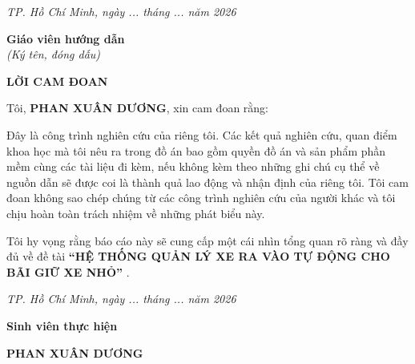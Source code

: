 \documentclass[13pt,a4paper]{report}
\begin{document}
\vspace{1.4cm}

\begin{flushright}
	{\large \textit{TP. Hồ Chí Minh, ngày ... tháng ... năm 2026}}
\end{flushright}

\vspace{0.6cm}

\begin{flushright}
	{\large \textbf{Giáo viên hướng dẫn}}\\[0.55cm]
	{\large \textit{(Ký tên, đóng dấu)}}
\end{flushright}

\newpage
\thispagestyle{empty}

\begin{center}
	{\LARGE \bfseries LỜI CAM ĐOAN}
\end{center}

\vspace{1.2cm}

\begin{center}
	\begin{minipage}{0.88\textwidth}
		\fontsize{14pt}{21pt}\selectfont
		\setlength{\parindent}{1.5cm}
		\justifying
		
		Tôi, \textbf{PHAN XUÂN DƯƠNG}, xin cam đoan rằng:
		
		Đây là công trình nghiên cứu của riêng tôi. Các kết quả nghiên cứu, quan điểm khoa học mà tôi nêu ra trong đồ án bao gồm quyền đồ án và sản phẩm phần mềm cùng các tài liệu đi kèm, nếu không kèm theo những ghi chú cụ thể về nguồn dẫn sẽ được coi là thành quả lao động và nhận định của riêng tôi. Tôi cam đoan không sao chép chúng từ các công trình nghiên cứu của người khác và tôi chịu hoàn toàn trách nhiệm về những phát biểu này.
		
		Tôi hy vọng rằng báo cáo này sẽ cung cấp một cái nhìn tổng quan rõ ràng và đầy đủ về đề tài \textbf{“HỆ THỐNG QUẢN LÝ XE RA VÀO TỰ ĐỘNG CHO BÃI GIỮ XE NHỎ”} .
		
	\end{minipage}
\end{center}

\vspace{1.4cm}

\begin{flushright}
	\begin{minipage}{0.48\textwidth}
		\centering
		\fontsize{14pt}{20pt}\selectfont
		\textit{TP. Hồ Chí Minh, ngày ... tháng ... năm 2026}
		
		\vspace{0.7cm}
		
		\textbf{Sinh viên thực hiện}
		
		\vspace{2cm}
		
		\textbf{PHAN XUÂN DƯƠNG}
	\end{minipage}
\end{flushright}
\end{document}
